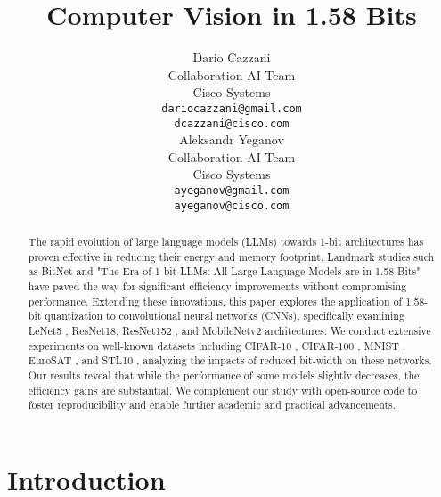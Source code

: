 \documentclass{article}
\title{Computer Vision in 1.58 Bits}
\author{%
  Dario Cazzani \\
  Collaboration AI Team \\
  Cisco Systems \\
  \texttt{dariocazzani@gmail.com} \\
  \texttt{dcazzani@cisco.com} \\
  \And
  Aleksandr Yeganov \\
  Collaboration AI Team \\
  Cisco Systems \\
  \texttt{ayeganov@gmail.com} \\
  \texttt{ayeganov@cisco.com}
}
\begin{document}
\maketitle

\begin{abstract}
  The rapid evolution of large language models (LLMs) towards 1-bit architectures has proven effective in reducing their energy and memory footprint. Landmark studies such as BitNet \cite{wang2023bitnet} and "The Era of 1-bit LLMs: All Large Language Models are in 1.58 Bits" \cite{ma2024era} have paved the way for significant efficiency improvements without compromising performance. Extending these innovations, this paper explores the application of 1.58-bit quantization to convolutional neural networks (CNNs), specifically examining LeNet5 \cite{lecun-gradientbased-learning-applied-1998}, ResNet18, ResNet152 \cite{he2015deep}, and MobileNetv2 \cite{sandler2019mobilenetv2} architectures. We conduct extensive experiments on well-known datasets including CIFAR-10 \cite{cifar10}, CIFAR-100 \cite{cifar100}, MNIST \cite{deng2012mnist}, EuroSAT \cite{helber2019eurosat}, and STL10 \cite{stl10}, analyzing the impacts of reduced bit-width on these networks. Our results reveal that while the performance of some models slightly decreases, the efficiency gains are substantial. We complement our study with open-source code to foster reproducibility and enable further academic and practical advancements.
\end{abstract}


\section{Introduction}
\end{document}
